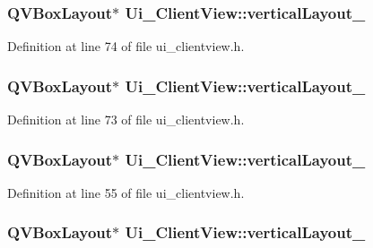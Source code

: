 \subsubsection[{vertical\+Layout\+\_\+3}]{\setlength{\rightskip}{0pt plus 5cm}Q\+V\+Box\+Layout$\ast$ Ui\+\_\+\+Client\+View\+::vertical\+Layout\+\_}\label{class_ui___client_view_a3b7c797d484375f1404408e0fcf7d50b}


Definition at line 74 of file ui\+\_\+clientview.\+h.

\hypertarget{class_ui___client_view_ac172cec975a952bffc95a5d26e75cb05}{}
\subsubsection[{vertical\+Layout\+\_\+4}]{\setlength{\rightskip}{0pt plus 5cm}Q\+V\+Box\+Layout$\ast$ Ui\+\_\+\+Client\+View\+::vertical\+Layout\+\_}\label{class_ui___client_view_ac172cec975a952bffc95a5d26e75cb05}


Definition at line 73 of file ui\+\_\+clientview.\+h.

\hypertarget{class_ui___client_view_a73aac195d597a038c596f7f3c2b66cdd}{}
\subsubsection[{vertical\+Layout\+\_\+5}]{\setlength{\rightskip}{0pt plus 5cm}Q\+V\+Box\+Layout$\ast$ Ui\+\_\+\+Client\+View\+::vertical\+Layout\+\_}\label{class_ui___client_view_a73aac195d597a038c596f7f3c2b66cdd}


Definition at line 55 of file ui\+\_\+clientview.\+h.

\hypertarget{class_ui___client_view_afaddc7ad8ce27d2a2212231f2e60d1e9}{}
\subsubsection[{vertical\+Layout\+\_\+6}]{\setlength{\rightskip}{0pt plus 5cm}Q\+V\+Box\+Layout$\ast$ Ui\+\_\+\+Client\+View\+::vertical\+Layout\+\_}\label{class_ui___client_view_afaddc7ad8ce27d2a2212231f2e60d1e9}


